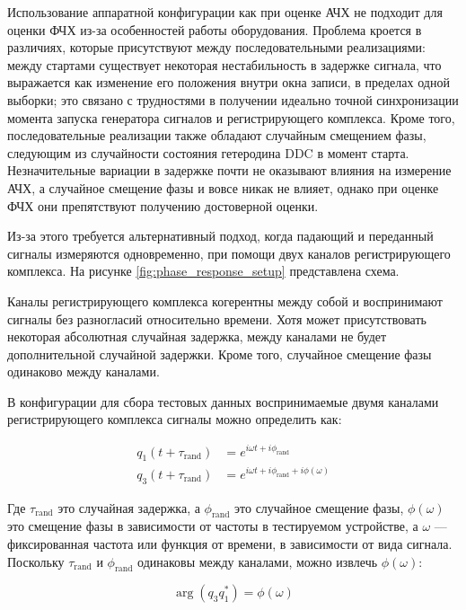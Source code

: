\documentclass{report}
\begin{document}
Использование аппаратной конфигурации как при оценке АЧХ не подходит для оценки ФЧХ из-за особенностей работы оборудования. Проблема кроется в различиях, которые присутствуют между последовательными реализациями: между стартами существует некоторая нестабильность в задержке сигнала, что выражается как изменение его положения внутри окна записи, в пределах одной выборки; это связано с трудностями в получении идеально точной синхронизации момента запуска генератора сигналов и регистрирующего комплекса. Кроме того, последовательные реализации также обладают случайным смещением фазы, следующим из случайности состояния гетеродина DDC в момент старта. Незначительные вариации в задержке почти не оказывают влияния на измерение АЧХ, а случайное смещение фазы и вовсе никак не влияет, однако при оценке ФЧХ они препятствуют получению достоверной оценки.

Из-за этого требуется альтернативный подход, когда падающий и переданный сигналы измеряются одновременно, при помощи двух каналов регистрирующего комплекса. На рисунке \ref{fig:phase_response_setup} представлена схема.


Каналы регистрирующего комплекса когерентны между собой и воспринимают сигналы без разногласий относительно времени. Хотя может присутствовать некоторая абсолютная случайная задержка, между каналами не будет дополнительной случайной задержки. Кроме того, случайное смещение фазы одинаково между каналами.

В конфигурации для сбора тестовых данных воспринимаемые двумя каналами регистрирующего комплекса сигналы можно определить как:

\begin{align}
q_1(t + \tau_\text{rand}) &= e^{i \omega t + i \phi_\text{rand} } \\
q_3(t + \tau_\text{rand}) &= e^{i \omega t + i \phi_\text{rand} + i \phi(\omega)}
\end{align}

Где $\tau_\text{rand}$ это случайная задержка, а $\phi_\text{rand}$ это случайное смещение фазы, $\phi(\omega)$ это смещение фазы в зависимости от частоты в тестируемом устройстве, а $\omega$ --- фиксированная частота или функция от времени, в зависимости от вида сигнала. Поскольку $\tau_\text{rand}$ и $\phi_\text{rand}$ одинаковы между каналами, можно извлечь $\phi(\omega)$:

\begin{equation}
\arg(q_3 q_1^*) = \phi(\omega)
\end{equation}
\end{document}
